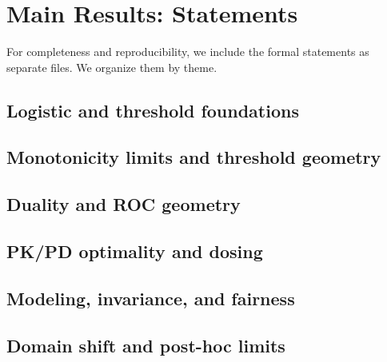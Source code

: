 \documentclass[11pt]{article}
\numberwithin{equation}{section}
\theoremstyle{plain}
\theoremstyle{definition}
\theoremstyle{remark}
\begin{document}
\section{Main Results: Statements}
For completeness and reproducibility, we include the formal statements as separate files. We organize them by theme.

\subsection*{Logistic and threshold foundations}





\subsection*{Monotonicity limits and threshold geometry}



\subsection*{Duality and ROC geometry}






\subsection*{PK/PD optimality and dosing}









\subsection*{Modeling, invariance, and fairness}







\subsection*{Domain shift and post-hoc limits}


\end{document}
